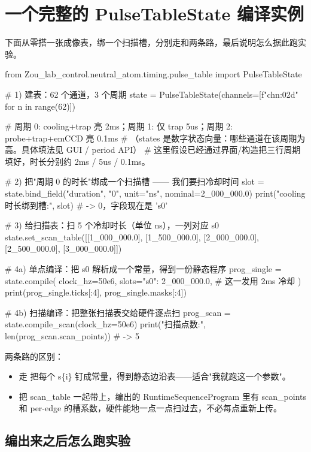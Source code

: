 \documentclass[11pt,oneside,openany]{book}
\begin{document}
\section{一个完整的 PulseTableState 编译实例}

下面从零搭一张成像表，绑一个扫描槽，分别走和两条路，最后说明怎么据此跑实验。

\begin{codeblock}[Python]
from Zou_lab_control.neutral_atom.timing.pulse_table import PulseTableState

# 1) 建表：62 个通道，3 个周期
state = PulseTableState(channels=[f"ch{n:02d}" for n in range(62)])

# 周期 0: cooling+trap 亮 2ms；周期 1: 仅 trap 5us；周期 2: probe+trap+emCCD 亮 0.1ms
# （states 是数字状态向量：哪些通道在该周期为高。具体填法见 GUI / period API）
# 这里假设已经通过界面/构造把三行周期填好，时长分别约 2ms / 5us / 0.1ms。

# 2) 把"周期 0 的时长"绑成一个扫描槽 —— 我们要扫冷却时间
slot = state.bind_field("duration", "0", unit="ns", nominal=2_000_000.0)
print("cooling 时长绑到槽:", slot)   # -> 0，字段现在是 's0'

# 3) 给扫描表：扫 5 个冷却时长（单位 ns），一列对应 s0
state.set_scan_table([[1_000_000.0],
                      [1_500_000.0],
                      [2_000_000.0],
                      [2_500_000.0],
                      [3_000_000.0]])

# 4a) 单点编译：把 s0 解析成一个常量，得到一份静态程序
prog_single = state.compile(
    clock_hz=50e6,
    slots={"s0": 2_000_000.0},   # 这一发用 2ms 冷却
)
print(prog_single.ticks[:4], prog_single.masks[:4])

# 4b) 扫描编译：把整张扫描表交给硬件逐点扫
prog_scan = state.compile_scan(clock_hz=50e6)
print("扫描点数:", len(prog_scan.scan_points))   # -> 5
\end{codeblock}

两条路的区别：
\begin{itemize}
\item {} 走  把每个 s\{i\} 钉成常量，得到静态边沿表——适合"我就跑这一个参数"。
\item {} 把 scan\_table 一起带上，编出的 RuntimeSequenceProgram 里有 scan\_points 和 per-edge 的槽系数，硬件能地一点一点扫过去，不必每点重新上传。
\end{itemize}

\subsection{编出来之后怎么跑实验}
\end{document}
